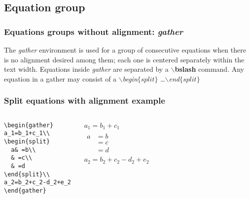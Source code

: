 \documentclass[12pt]{beamer}
\begin{document}
  \subsection{Equation group}
  \begin{frame}
    \frametitle{Equations groups without alignment: \emph{gather}}
    The \emph{gather} environment is used for a group of consecutive equations when there is no alignment desired among them; each one is centered separately within the text width. Equations inside \emph{gather} are separated by a $\backslash$\textbf{bslash} command. Any equation in a gather may consist of a \emph{$\backslash$begin$\{split\}$} \ldots \emph{$\backslash$end$\{split\}$}
  \end{frame}

\begin{frame}[fragile]
\frametitle{Split equations with alignment example}
    \begin{columns}
        \begin{block}{}
        \begin{verbatim}
\begin{gather}
a_1=b_1+c_1\\
\begin{split}
  a& =b\\
  & =c\\
  & =d
\end{split}\\
a_2=b_2+c_2-d_2+e_2
\end{gather}
        \end{verbatim}
        \end{block}
        \begin{block}{}
        \begin{gather}
        a_1=b_1+c_1\\
        \begin{split}
          a& =b\\
           & =c\\
           & =d
        \end{split}\\
        a_2=b_2+c_2-d_2+e_2
        \end{gather}
        \end{block}
    \end{columns}

\end{frame}
\end{document}

